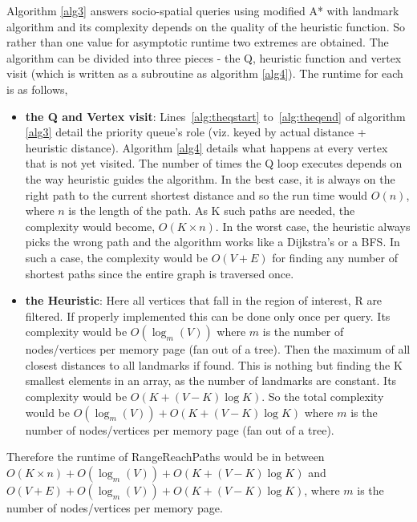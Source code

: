 Algorithm \ref{alg3} answers socio-spatial queries using modified A* with landmark algorithm and its complexity depends on the quality of the heuristic function. So rather than one value for asymptotic runtime two extremes are obtained. The algorithm can be divided into three pieces - the Q, heuristic function and vertex visit (which is written as a subroutine as algorithm \ref{alg4}). The runtime for each is as follows,

\begin{itemize}

	\item \textbf{the Q and Vertex visit}: Lines~\ref{alg:theqstart} to~\ref{alg:theqend} of algorithm \ref{alg3} detail the priority queue's role (viz. keyed by actual distance + heuristic distance). Algorithm \ref{alg4} details what happens at every vertex that is not yet visited. The number of times the Q loop executes depends on the way heuristic guides the algorithm. In the best case, it is always on the right path to the current shortest distance and so the run time would $O(n)$, where $n$ is the length of the path. As K such paths are needed, the complexity would become, $O(K \times n)$. In the worst case, the heuristic always picks the wrong path and the algorithm works like a Dijkstra's or a BFS. In such a case, the complexity would be $O(V + E)$ for finding any number of shortest paths since the entire graph is traversed once.

	\item \textbf{the Heuristic}: Here all vertices that fall in the region of interest, R are filtered. If properly implemented this can be done only once per query. Its complexity would be $O(\log_m (V))$ where $m$ is the number of nodes/vertices per memory page (fan out of a tree). Then the maximum of all closest distances to all landmarks if found. This is nothing but finding the K smallest elements in an array, as the number of landmarks are constant. Its complexity would be $O(K + (V-K)\log K)$. So the total complexity would be $O(\log_m (V)) + O(K + (V-K)\log K)$ where $m$ is the number of nodes/vertices per memory page (fan out of a tree).
\end{itemize}


Therefore the runtime of RangeReachPaths would be in between $O(K \times n) + O(\log_m (V)) + O(K + (V-K)\log K)$ and $O(V + E) + O(\log_m (V)) + O(K + (V-K)\log K)$, where $m$ is the number of nodes/vertices per memory page.
